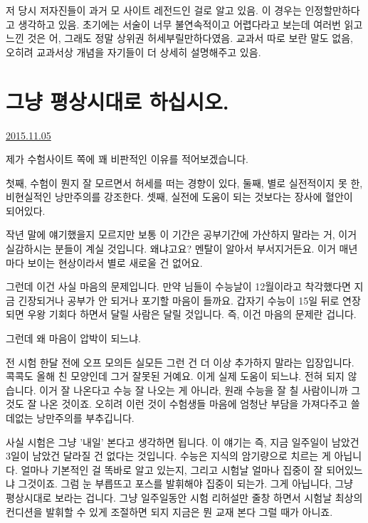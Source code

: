 저 당시 저자진들이 과거 모 사이트 레전드인 걸로 알고 있음. 이 경우는 인정할만하다고 생각하고 있음.
초기에는 서술이 너무 불연속적이고 어렵다라고 보는데 여러번 읽고 느낀 것은 어, 그래도 정말 상위권 허세부릴만하다였음.
교과서 따로 보란 말도 없음, 오히려 교과서상 개념을 자기들이 더 상세히 설명해주고 있음.
\vspace{5mm}





\section{그냥 평상시대로 하십시오.}
\href{https://www.kockoc.com/Apoc/465514}{2015.11.05}

\vspace{5mm}

제가 수험사이트 쪽에 꽤 비판적인 이유를 적어보겠습니다.
\vspace{5mm}

첫째, 수험이 뭔지 잘 모르면서 허세를 떠는 경향이 있다,
둘째, 별로 실전적이지 못 한, 비현실적인 낭만주의를 강조한다.
셋째, 실전에 도움이 되는 것보다는 장사에 혈안이 되어있다.
\vspace{5mm}

작년 말에 얘기했을지 모르지만 보통 이 기간은 공부기간에 가산하지 말라는 거, 이거 실감하시는 분들이 계실 것입니다.
왜냐고요? 멘탈이 알아서 부서지거든요.
이거 매년마다 보이는 현상이라서 별로 새로울 건 없어요.
\vspace{5mm}

그런데 이건 사실 마음의 문제입니다. 만약 님들이 수능날이 12월이라고 착각했다면 지금 긴장되거나 공부가 안 되거나 포기할 마음이 들까요.
갑자기 수능이 15일 뒤로 연장되면 우왕 기회다 하면서 달릴 사람은 달릴 것입니다.
즉, 이건 마음의 문제란 겁니다.
\vspace{5mm}

그런데 왜 마음이 압박이 되느냐.
\vspace{5mm}

전 시험 한달 전에 오프 모의든 실모든 그런 건 더 이상 추가하지 말라는 입장입니다. 콕콕도 올해 친 모양인데 그거 잘못된 거예요.
이게 실제 도움이 되느냐. 전혀 되지 않습니다. 이거 잘 나온다고 수능 잘 나오는 게 아니라, 원래 수능을 잘 칠 사람이니까 그것도 잘 나온 것이죠.
오히려 이런 것이 수험생들 마음에 엄청난 부담을 가져다주고 쓸데없는 낭만주의를 부추깁니다.
\vspace{5mm}

사실 시험은 그냥 '내일' 본다고 생각하면 됩니다. 이 얘기는 즉, 지금 일주일이 남았건 3일이 남았건 달라질 건 없다는 것입니다.
수능은 지식의 암기량으로 치르는 게 아닙니다. 얼마나 기본적인 걸 똑바로 알고 있는지, 그리고 시험날 얼마나 집중이 잘 되어있느냐 그것이죠.
그럼 눈 부릅뜨고 포스를 발휘해야 집중이 되는가. 그게 아닙니다, 그냥 평상시대로 보라는 겁니다.
그냥 일주일동안 시험 리허설만 줄창 하면서 시험날 최상의 컨디션을 발휘할 수 있게 조절하면 되지 지금은 뭔 교재 본다 그럴 때가 아니죠.
\vspace{5mm}


